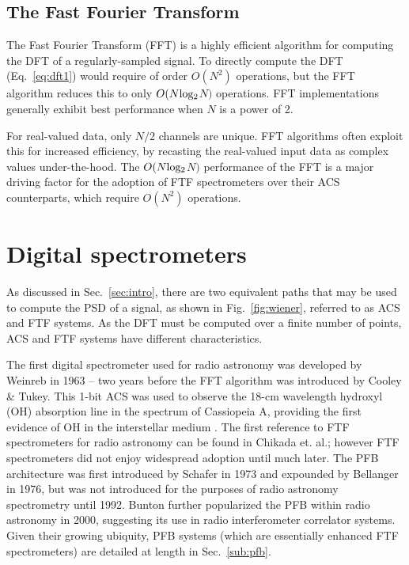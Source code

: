 \documentclass{ws-rv961x669}
\begin{document}
\subsection{The Fast Fourier Transform\label{sub:fft}}

The Fast Fourier Transform\cite{Cooley1965, BookBrighamFFT} (FFT) is a highly efficient algorithm for computing the DFT of a regularly-sampled signal.
To directly compute the DFT (Eq.~\ref{eq:dft1})
would require of order $O(N^2)$ operations, but the FFT algorithm reduces this to only $O(N \rm{log_2}$$N)$ operations. FFT implementations generally exhibit best performance when $N$ is a power of 2. 

For real-valued data, only $N/2$ channels are unique. FFT algorithms often exploit this for increased efficiency, by recasting the real-valued input data as complex values under-the-hood. The  $O(N \rm{log_2}$$N)$ performance of the FFT is a major driving factor for the adoption of FTF spectrometers over their ACS counterparts, which require $O(N^2)$ operations. 


\section{Digital spectrometers}
As discussed in Sec.~\ref{sec:intro}, there are two equivalent paths that may be used to compute the PSD of a signal, as shown in  Fig.~\ref{fig:wiener}, referred to as ACS and FTF systems. As the DFT must be computed over a finite number of points, ACS and FTF systems have different characteristics. 

The first digital spectrometer used for radio astronomy was developed by Weinreb\citet{Weinreb:1963p10042} in 1963 -- two years before the FFT algorithm was introduced by Cooley \& Tukey\cite{Cooley1965}. This 1-bit ACS was used to observe the 18-cm wavelength hydroxyl (OH) absorption line in the spectrum of Cassiopeia A, providing the first evidence of OH in the interstellar medium \citep{Weinreb:1963p9992}. The first reference to FTF spectrometers for radio astronomy can be found in Chikada et. al.\citet{Chikada:1987p10044}; however FTF spectrometers did not enjoy widespread adoption until much later. The PFB architecture was first introduced by Schafer\cite{Schafer1973} in 1973 and expounded by Bellanger\cite{Bellanger:1976p7898} in 1976, but was not introduced for the purposes of radio astronomy spectrometry until 1992\cite{Duluk1992}. Bunton\cite{Bunton2000} further popularized the PFB within radio astronomy in 2000, suggesting its use in radio interferometer correlator systems. Given their growing ubiquity, PFB systems (which are essentially enhanced FTF spectrometers) are detailed at length in Sec.~\ref{sub:pfb}.
\end{document}
